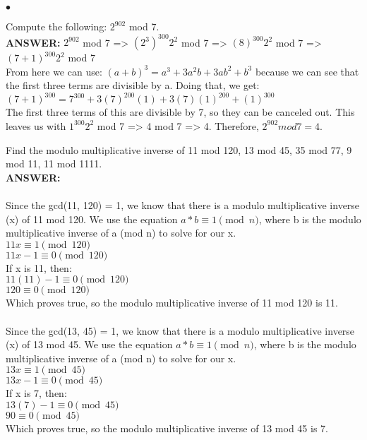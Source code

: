\documentclass{article}
\newenvironment{myitem}{\begin{list}{$\bullet$}
{\setlength{\itemsep}{-0pt}
\setlength{\topsep}{0pt}
\setlength{\labelwidth}{0pt}
\setlength{\leftmargin}{10pt}
\setlength{\parsep}{-0pt}
\setlength{\itemsep}{0pt}
\setlength{\partopsep}{0pt}}}%
{\end{list}}
\begin{document}
\begin{myitem}
\item Compute the following: $2^{902}$ mod 7.\\

{\bfseries ANSWER: }$2^{902}$ mod 7 => $(2^{3})^{300}2^{2}$ mod 7 => $(8)^{300}2^{2}$ mod 7
=> $(7+1)^{300}2^{2}$ mod 7\\
From here we can use:  $(a+b)^{3} = a^{3} + 3a^{2}b + 3ab^{2} + b^{3}$ because we can see that the first three terms are divisible by a. Doing that, we get:\\
$(7+1)^{300} = 7^{300} + 3(7)^{200}(1) + 3(7)(1)^{200} + (1)^{300}$\\
The first three terms of this are divisible by 7, so they can be canceled out.
This leaves us with $1^{300}2^{2}$ mod 7 => 4 mod 7 => 4. Therefore, $2^{902} mod 7 = 4$.\\

\item Find the modulo multiplicative inverse of 11 mod 120, 13 mod 45,
  35 mod 77, 9 mod 11, 11 mod 1111.\\

{\bfseries ANSWER: }\\
\\
Since the gcd(11, 120) = 1, we know that there is a modulo multiplicative inverse
(x) of 11 mod 120. We use the equation $a*b \equiv 1 \pmod{n}$, where b is the
modulo multiplicative inverse of a (mod n) to solve for our x.\\
$11x \equiv 1 \pmod{120}$\\
$11x - 1  \equiv 0 \pmod{120}$\\
If x is 11, then:\\
$11(11)-1 \equiv 0 \pmod{120}$\\
$120 \equiv 0 \pmod{120}$\\
Which proves true, so the modulo multiplicative inverse of 11 mod 120 is 11.\\

 \\
Since the gcd(13, 45) = 1, we know that there is a modulo multiplicative inverse
(x) of 13 mod 45. We use the equation $a*b \equiv 1 \pmod{n}$, where b is the
modulo multiplicative inverse of a (mod n) to solve for our x.\\
$13x \equiv 1 \pmod{45}$\\
$13x - 1  \equiv 0 \pmod{45}$\\
If x is 7, then:\\
$13(7)-1 \equiv 0 \pmod{45}$\\
$90 \equiv 0 \pmod{45}$\\
Which proves true, so the modulo multiplicative inverse of 13 mod 45 is 7.\\


\end{myitem}
\end{document}
